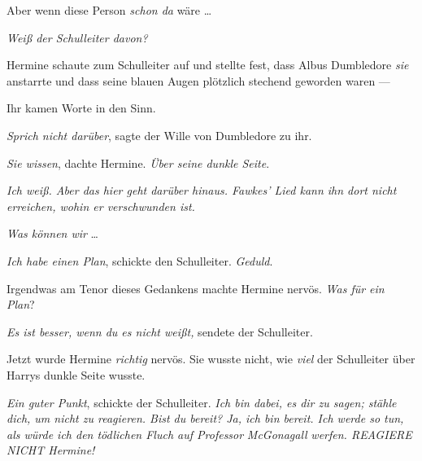 Aber wenn diese Person \emph{schon da} wäre …

\emph{Weiß der Schulleiter davon?}

Hermine schaute zum Schulleiter auf und stellte fest, dass Albus Dumbledore \emph{sie} anstarrte und dass seine blauen Augen plötzlich stechend geworden waren —

Ihr kamen Worte in den Sinn.

\emph{Sprich nicht darüber}, sagte der Wille von Dumbledore zu ihr.

\emph{Sie wissen}, dachte Hermine. \emph{Über seine dunkle Seite}.

\emph{Ich weiß. Aber das hier geht darüber hinaus. Fawkes’ Lied kann ihn dort nicht erreichen, wohin er verschwunden ist.}

\emph{Was können wir} …

\emph{Ich habe einen Plan}, schickte den Schulleiter. \emph{Geduld}.

Irgendwas am Tenor dieses Gedankens machte Hermine nervös. \emph{Was für ein Plan}?

\emph{Es ist besser, wenn du es nicht weißt,} sendete der Schulleiter.

Jetzt wurde Hermine \emph{richtig} nervös. Sie wusste nicht, wie \emph{viel} der Schulleiter über Harrys dunkle Seite wusste.

\emph{Ein guter Punkt}, schickte der Schulleiter. \emph{Ich bin dabei, es dir zu sagen; stähle dich, um nicht zu reagieren. Bist du bereit? Ja, ich bin bereit. Ich werde so tun, als würde ich den tödlichen Fluch auf Professor} \emph{McGonagall} \emph{werfen. REAGIERE NICHT Hermine!}

